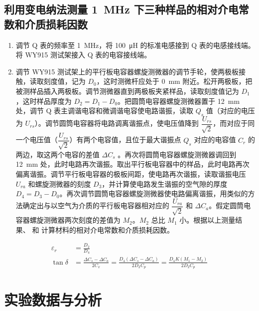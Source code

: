     \subsection{利用变电纳法测量 \SI{1}{\mega\hertz} 下三种样品的相对介电常数和介质损耗因数}
        \begin{enumerate}
            \item 调节 Q 表的频率至 \SI{1}{\mega\hertz}，将 \SI{100}{\micro\henry} 的标准电感接到 Q 表的电感接线端。将 WY915 测试架接入 Q 表的电容接线端。
            \item 调节 WY915 测试架上的平行板电容器螺旋测微器的调节手轮，使两极板接触，读取刻度值，记为 $D_0$，这时测微杆应处于 \SI{0}{\milli\metre} 附近。松开两极板，把被测样品插入两极板。调节测微器直到两极板夹紧样品，读取刻度值记为 $D_1$，这时样品厚度为 $D_2 = D_1 - D_0$。把圆筒电容器螺旋测微器置于 \SI{12}{\milli\metre} 处，调节 Q 表主调谐电容和微调谐电容使电路谐振，读取 $Q_s$ 值（对应的电压为 $U_{rs}$）。调节圆筒电容器将电路调离谐振点，使电压值降到 $\dfrac{U_{rs}}{\sqrt{2}}$，而对应于同一个电压值（$\dfrac{U_{rs}}{\sqrt{2}}$）有两个电容值，且位于最大谐振点 $Q_s$ 对应的电容值 $C_r$ 的两边，取这两个电容的差值 $\varDelta C_s$ 。再次将圆筒电容器螺旋测微器调回到 \SI{12}{\milli\metre} 处，此时电路再次谐振。取出平行板电容器中的样品，此时电路再次偏离谐振。调节平行板电容器的极板间距，使电路再次谐振，读取谐振电压 $U_{ra}$ 和螺旋测微器的刻度 $D_3$，并计算使电路发生谐振的空气隙的厚度 $D_4=D_3-D_0$。再次调节圆筒电容器螺旋测微器使电路偏离谐振，用类似的方法确定出与以空气为介质的平行板电容器相对应的 $\dfrac{U_{ra}}{\sqrt{2}}$ 和 $\varDelta C_a$。假定圆筒电容器螺旋测微器两次刻度的差值为 $M_2$。$M_2$ 总比 $M_1$ 小。根据以上测量结果、 和 计算材料的相对介电常数和介质损耗因数。
        \end{enumerate}
        \begin{align}
            \varepsilon_r&=\frac{D_2}{D_4}\label{eq23}\\
            \tan\delta&=\frac{\Delta C_{s}-\Delta C_{a}}{2C_{x}}=\frac{D_{4}(\Delta C_{s}-\Delta C_{a})}{2D_{2}C_{p}}=\frac{D_{4}K(M_{1}-M_{2})}{2D_{2}C_{p}}\label{eq24}
        \end{align}
\section{实验数据与分析}

